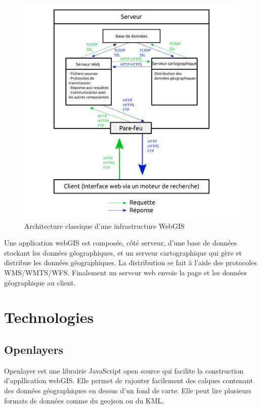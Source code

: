\documentclass[
    iai, %
    il, %
]{heig-tb}
\begin{document}
\begin{figure}[H]
    \caption{Architecture classique d'une infrastructure WebGIS}
    \centering
    \includegraphics[scale=0.3]{webGIS_archi.png}
\end{figure}

Une application webGIS \cite{architecture-webgis} est composée, côté serveur, d'une base de données stockant les données géographiques, et un serveur cartographique qui gère et distribue les données géographiques.
La distribution se fait à l'aide des protocoles WMS/WMTS/WFS.
Finalement un serveur web envoie la page et les données géographique au client.

\section{Technologies}

\subsection{Openlayers}
Openlayer \cite{openlayers} est une librairie JavaScript open source qui facilite la construction d'appllication webGIS.
Elle permet de rajouter facilement des calques contenant des données géographiques en dessus d'un fond de carte.
Elle peut lire plusieurs formats de données comme du geojson ou du KML.
\end{document}
